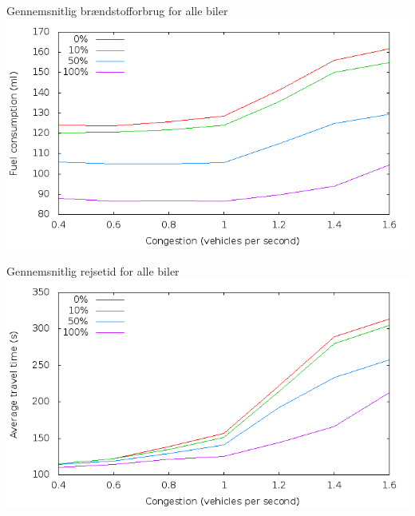 \begin{frame}{Gennemsnitlig brændstofforbrug for alle biler}
\includegraphics[width=1\textwidth]{../images/fuelCongestion.png}
\end{frame}

\begin{frame}{Gennemsnitlig rejsetid for alle biler}
\includegraphics[width=1\textwidth]{../images/timeCongestion.png}
\end{frame}

